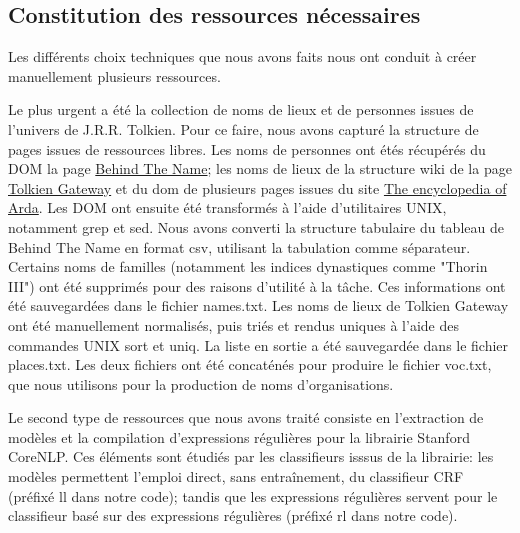 \documentclass{article}
\begin{document}
\subsection{Constitution des ressources nécessaires}
\par
Les différents choix techniques que nous avons faits nous ont conduit à créer manuellement plusieurs ressources.
\par
Le plus urgent a été la collection de noms de lieux et de personnes issues de l'univers de J.R.R. Tolkien.
Pour ce faire, nous avons capturé la structure de pages issues de ressources libres.
Les noms de personnes ont étés récupérés du DOM la page \href{https://www.behindthename.com/namesakes/list/tolkien/alpha}{Behind The Name}; les noms de lieux de la structure wiki de la page \href{http://tolkiengateway.net/w/index.php?title=List_of_Place_Names}{Tolkien Gateway} et du dom de plusieurs pages issues du site \href{http://www.glyphweb.com/arda/default.asp}{The encyclopedia of Arda}.
Les DOM ont ensuite été transformés à l'aide d'utilitaires UNIX, notamment grep et sed.
Nous avons converti la structure tabulaire du tableau de Behind The Name en format csv, utilisant la tabulation comme séparateur.
Certains noms de familles (notamment les indices dynastiques comme "Thorin III") ont été supprimés pour des raisons d'utilité à la tâche.
Ces informations ont été sauvegardées dans le fichier names.txt.
Les noms de lieux de Tolkien Gateway ont été manuellement normalisés, puis triés et rendus uniques à l'aide des commandes UNIX sort et uniq.
La liste en sortie a été sauvegardée dans le fichier places.txt.
Les deux fichiers ont été concaténés pour produire le fichier voc.txt, que nous utilisons pour la production de noms d'organisations.
\par
Le second type de ressources que nous avons traité consiste en l'extraction de modèles et la compilation d'expressions régulières pour la librairie Stanford CoreNLP.
Ces éléments sont étudiés par les classifieurs isssus de la librairie: les modèles permettent l'emploi direct, sans entraînement, du classifieur CRF (préfixé ll dans notre code); tandis que les expressions régulières servent pour le classifieur basé sur des expressions régulières (préfixé rl dans notre code).
\end{document}
